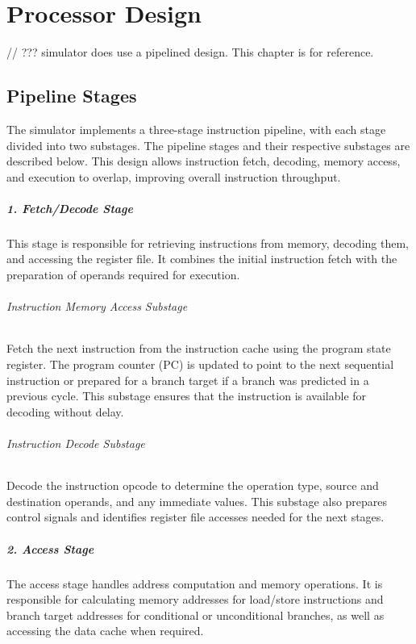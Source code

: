 \chapter*{Processor Design}

// ??? simulator does use a pipelined design. This chapter is for reference.

\section*{Pipeline Stages}

The simulator implements a three-stage instruction pipeline, with each stage
divided into two substages. The pipeline stages and their respective substages
are described below. This design allows instruction fetch, decoding, memory
access, and execution to overlap, improving overall instruction throughput.

\paragraph{1. Fetch/Decode Stage}
This stage is responsible for retrieving instructions from memory, decoding
them, and accessing the register file. It combines the initial instruction fetch
with the preparation of operands required for execution.

\subparagraph{Instruction Memory Access Substage}
Fetch the next instruction from the instruction cache using the program state
register. The program counter (PC) is updated to point to the next sequential
instruction or prepared for a branch target if a branch was predicted in a
previous cycle. This substage ensures that the instruction is available for
decoding without delay.

\subparagraph{Instruction Decode Substage}
Decode the instruction opcode to determine the operation type, source and
destination operands, and any immediate values. This substage also prepares
control signals and identifies register file accesses needed for the next stages.

\paragraph{2. Access Stage}
The access stage handles address computation and memory operations. It is
responsible for calculating memory addresses for load/store instructions and
branch target addresses for conditional or unconditional branches, as well as
accessing the data cache when required.

